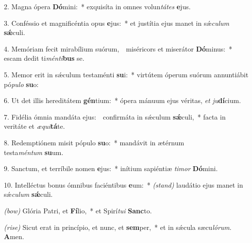 2. Magna ópera \textbf{Dó}mini:~*
	exquisíta in omnes volun\textit{tá}\textit{tes} \textbf{e}jus.

3. Conféssio et magnificéntia opus \textbf{e}jus:~*
	et justítia ejus manet in s\'{\ae}\textit{cu}\-\textit{lum} \textbf{s\'{\ae}}culi.

4. Memóriam fecit mirabílium suórum,~{\color{red}\GreDagger}\
	miséricors et miserátor \textbf{Dó}\-minus:~*
	escam dedit ti\textit{mén}\textit{ti}\textbf{bus} se.

5. Memor erit in s\'{\ae}culum testaménti \textbf{su}i:~*
	virtútem óperum suórum annuntiábit pó\textit{pu}\textit{lo} \textbf{su}o:

6. Ut det illis hereditátem \textbf{gén}ti\-um:~*
	ópera mánuum ejus véritas, \textit{et} \textit{ju}\textbf{dí}\-cium.

7. Fidélia ómnia mandáta ejus:~{\color{red}\GreDagger}\
	confirmáta in s\'{\ae}culum \textbf{s\'{\ae}}culi,~*
	facta in veritáte et \textit{æ}\textit{qui}\textbf{tá}te.

8. Redemptiónem misit pópulo \textbf{su}o:~*
	mandávit in ætérnum\\ testa\textit{mén}\textit{tum} \textbf{su}um.

9. Sanctum, et terríbile nomen \textbf{e}jus:~*
	inítium sapiéntiæ \textit{ti}\textit{mor} \textbf{Dó}\-mini.

10. Intelléctus bonus ómnibus faciéntibus \textbf{e}um:~* {\color{red}\textit{(stand)}}
	laudátio ejus manet in s\'{\ae}\textit{cu}\textit{lum} \textbf{s\'{\ae}}culi.

{\color{red}\textit{(bow)}} Glória Patri, et \textbf{Fí}lio,~*
	et Spirí\textit{tu}\textit{i} \textbf{Sanc}to.

{\color{red}\textit{(rise)}} Sicut erat in princípio, et nunc, et \textbf{sem}per,~*
	et in s\'{\ae}cula sæcu\textit{ló}\textit{rum}. \textbf{A}men.